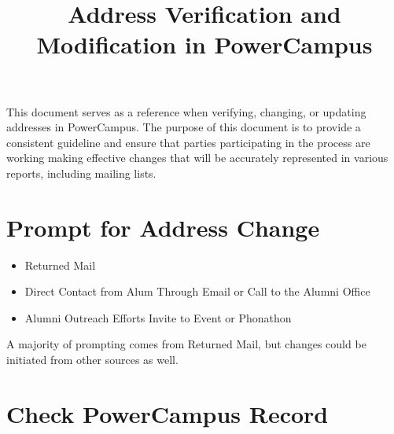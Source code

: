 \documentclass{article}
\title{Address Verification and Modification in PowerCampus}
\date{}
\begin{document}
\maketitle
This document serves as a reference when verifying, changing, or updating addresses in PowerCampus. The purpose of this document is to provide a consistent guideline and ensure that parties participating in the process are working making effective changes that will be accurately represented in various reports, including mailing lists. 

\section{Prompt for Address Change}
\begin{itemize}
	\item Returned Mail
	\item Direct Contact from Alum
	\subitem Through Email or Call to the Alumni Office
	\item Alumni Outreach Efforts
	\subitem Invite to Event or Phonathon
\end{itemize}
A majority of prompting comes from Returned Mail, but changes could be initiated from other sources as well.

\section{Check PowerCampus Record}
\end{document}
